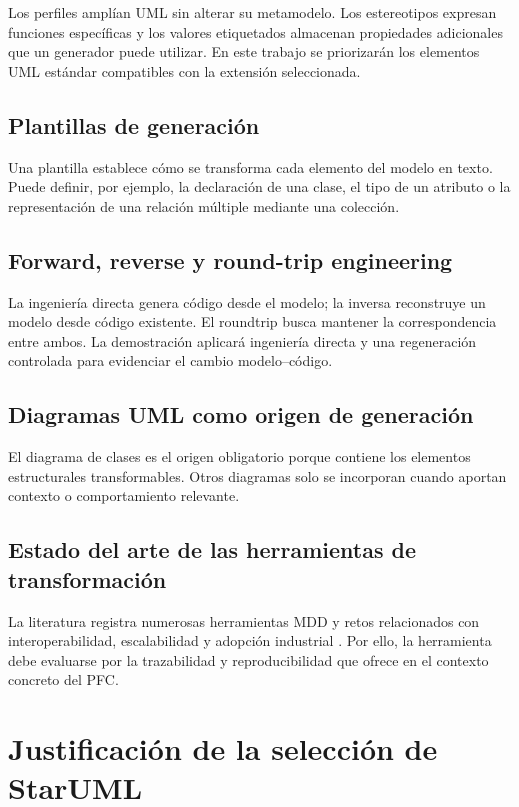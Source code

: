 \documentclass[12pt,a4paper]{article}
\begin{document}
Los perfiles amplían UML sin alterar su metamodelo. Los estereotipos expresan
funciones específicas y los valores etiquetados almacenan propiedades
adicionales que un generador puede utilizar. En este trabajo se priorizarán
los elementos UML estándar compatibles con la extensión seleccionada.

\subsection{Plantillas de generación}

Una plantilla establece cómo se transforma cada elemento del modelo en texto.
Puede definir, por ejemplo, la declaración de una clase, el tipo de un atributo
o la representación de una relación múltiple mediante una colección.

\subsection{Forward, reverse y round-trip engineering}

La ingeniería directa genera código desde el modelo; la inversa reconstruye
un modelo desde código existente. El roundtrip busca mantener la
correspondencia entre ambos. La demostración aplicará ingeniería directa y
una regeneración controlada para evidenciar el cambio modelo--código.

\subsection{Diagramas UML como origen de generación}

El diagrama de clases es el origen obligatorio porque contiene los elementos
estructurales transformables. Otros diagramas solo se incorporan cuando
aportan contexto o comportamiento relevante.

\subsection{Estado del arte de las herramientas de transformación}

La literatura registra numerosas herramientas MDD y retos relacionados con
interoperabilidad, escalabilidad y adopción industrial
\cite{kahani2019,bucchiarone2020}. Por ello, la herramienta debe evaluarse por
la trazabilidad y reproducibilidad que ofrece en el contexto concreto del PFC.


\section{Justificación de la selección de StarUML}
\end{document}
